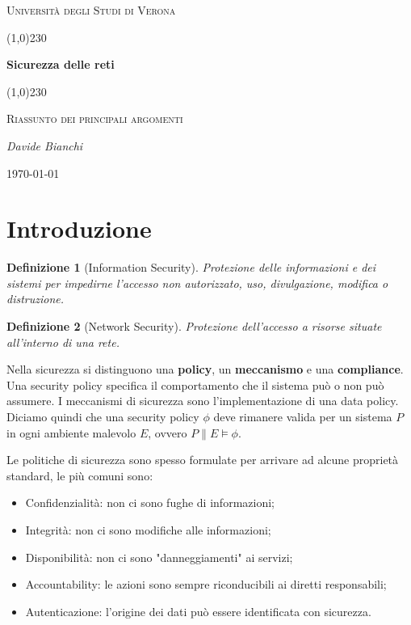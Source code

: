 \documentclass[a4paper, 10pt, twoside]{article}
\newtheorem{definit}{Definizione}[subsection]
\begin{document}
	\clearpage
	\begin{titlepage}
		\centering
		\vspace*{\fill}
		{\scshape\LARGE Università degli Studi di Verona \par}
		\vspace{1.5cm}
		\line(1,0){230} \\
		{\huge\bfseries Sicurezza delle reti\par}
		\line(1,0){230} \\
		\vspace{0.5cm}
		{\scshape\Large Riassunto dei principali argomenti\par}
		\vspace{2cm}
		{\Large\itshape Davide Bianchi\par}
		\vspace{1cm}
		\vspace{5cm}
		\vspace*{\fill}
		{\large \today\par}
	\end{titlepage}
	\thispagestyle{empty}
	\newpage
	\tableofcontents
	\newpage
	
	\section{Introduzione}
	
	\begin{definit}[Information Security]
		Protezione delle informazioni e dei sistemi per impedirne l'accesso non autorizzato, uso, divulgazione, modifica o distruzione.
	\end{definit}
	
	\begin{definit}[Network Security]
		Protezione dell'accesso a risorse situate all'interno di una rete.
	\end{definit}
	
	Nella sicurezza si distinguono una \textbf{policy}, un \textbf{meccanismo} e una \textbf{compliance}.
	Una security policy specifica il comportamento che il sistema può o non può assumere. I meccanismi di sicurezza sono l'implementazione di una data policy. Diciamo quindi che una security policy $\phi$ deve rimanere valida per un sistema $P$ in ogni ambiente malevolo $E$, ovvero $P \parallel E \models \phi $.
	
	Le politiche di sicurezza sono spesso formulate per arrivare ad alcune proprietà standard, le più comuni sono:\begin{itemize}
		\item Confidenzialità: non ci sono fughe di informazioni;
		\item Integrità: non ci sono modifiche alle informazioni;
		\item Disponibilità: non ci sono "danneggiamenti" ai servizi;
		\item Accountability: le azioni sono sempre riconducibili ai diretti responsabili;
		\item Autenticazione: l'origine dei dati può essere identificata con sicurezza.
	\end{itemize}
	
\end{document}
